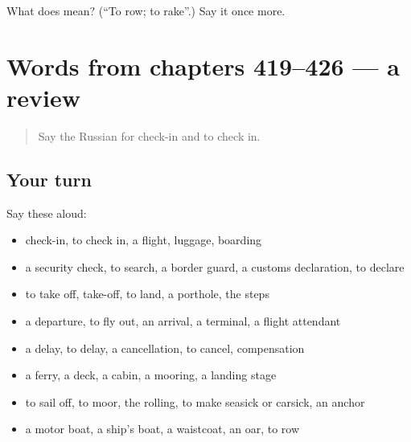 \begin{tcolorbox}[breakable,colback=teal!4,colframe=teal!35!black,title={Before you move on}]
What does  mean? (\textquotedblleft{}To row; to rake\textquotedblright{}.) Say it once more.
\end{tcolorbox}
\section[(dialogue)]{Words from chapters 419–426 — a review}

\label{lesson:RU-R426-review-419-426}



\begin{quote}
Say the Russian for check-in and to check in.
\end{quote}

\subsection*{Your turn}
Say these aloud:

\begin{itemize}
\raggedright
  \item check-in, to check in, a flight, luggage, boarding
  \item a security check, to search, a border guard, a customs declaration, to declare
  \item to take off, take-off, to land, a porthole, the steps
  \item a departure, to fly out, an arrival, a terminal, a flight attendant
  \item a delay, to delay, a cancellation, to cancel, compensation
  \item a ferry, a deck, a cabin, a mooring, a landing stage
  \item to sail off, to moor, the rolling, to make seasick or carsick, an anchor
  \item a motor boat, a ship's boat, a waistcoat, an oar, to row
\end{itemize}

